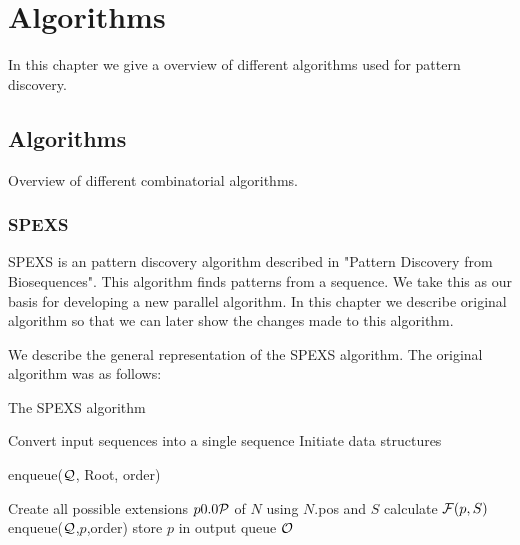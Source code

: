 \chapter{Algorithms}
\label{c:algorithms}

\WIP

In this chapter we give a overview of different algorithms used for pattern discovery.


\section{Algorithms}

Overview of different combinatorial algorithms.

\subsection{SPEXS}

SPEXS is an pattern discovery algorithm described in "Pattern Discovery from Biosequences"\cite{spexs}. This algorithm finds patterns from a sequence. We take this as our basis for developing a new parallel algorithm. In this chapter we describe original algorithm so that we can later show the changes made to this algorithm.

We describe the general representation of the SPEXS algorithm. 
The original algorithm was as follows:


\begin{algorithm}[H]
	\caption{The SPEXS algorithm}
\begin{algorithmic}[1]

	\State Convert input sequences into a single sequence
	\State Initiate data structures

	\State enqueue($\mathcal{Q}$, Root, order)

		\State Create all possible extensions $p \in \sym{P}$ of $N$ using $N$.pos and $S$
				\State calculate $\mathcal{F}(p,S)$
				\State enqueue($\mathcal{Q}$,$p$,order)
					\State store $p$ in output queue $\mathcal{O}$
				\EndIf
			\EndIf
		\EndFor
	\EndWhile
\end{algorithmic}
\end{algorithm}

